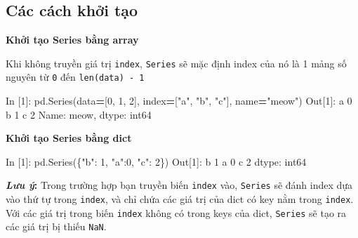 \documentclass[
]{book}
\makeatletter
\newenvironment{Shaded}{\begin{snugshade}}{\end{snugshade}}
\newcommand{\DecValTok}[1]{\textcolor[rgb]{0.00,0.00,0.81}{#1}}
\newcommand{\NormalTok}[1]{#1}
\newcommand{\OperatorTok}[1]{\textcolor[rgb]{0.81,0.36,0.00}{\textbf{#1}}}
\newcommand{\StringTok}[1]{\textcolor[rgb]{0.31,0.60,0.02}{#1}}
\newenvironment{kframe}{%
\medskip{}
\setlength{\fboxsep}{.8em}
 \def\at@end@of@kframe{}%
 \ifinner\ifhmode%
  \def\at@end@of@kframe{\end{minipage}}%
  \begin{minipage}{\columnwidth}%
 \fi\fi%
 \def\FrameCommand##1{\hskip\@totalleftmargin \hskip-\fboxsep
 \colorbox{shadecolor}{##1}\hskip-\fboxsep
     \hskip-\linewidth \hskip-\@totalleftmargin \hskip\columnwidth}%
 \MakeFramed {\advance\hsize-\width
   \@totalleftmargin\z@ \linewidth\hsize
   \@setminipage}}%
 {\par\unskip\endMakeFramed%
 \at@end@of@kframe}
\newenvironment{rmdblock}[1]
  {
  \begin{itemize}
  \renewcommand{\labelitemi}{
    \raisebox{-.7\height}[0pt][0pt]{
      {\setkeys{Gin}{width=3em,keepaspectratio}\texttt{[image: images/\#1]}}
    }
  }
  \setlength{\fboxsep}{1em}
  \begin{kframe}
  \item
  }
  {
  \end{kframe}
  \end{itemize}
  }
\newenvironment{rmdnote}
  {\begin{rmdblock}{note}}
  {\end{rmdblock}}
\makeatother
\begin{document}
\hypertarget{cuxe1c-cuxe1ch-khux1edfi-tux1ea1o}{%
\subsection{Các cách khởi tạo}\label{cuxe1c-cuxe1ch-khux1edfi-tux1ea1o}}

\textbf{Khởi tạo Series bằng array}

Khi không truyền giá trị \texttt{index}, \texttt{Series} sẽ mặc định index của nó là 1 mảng số nguyên từ \texttt{0} đến \texttt{len(data)\ -\ 1}

\begin{Shaded}
\begin{Highlighting}[]
\NormalTok{In [}\DecValTok{1}\NormalTok{]: pd.Series(data}\OperatorTok{=}\NormalTok{[}\DecValTok{0}\NormalTok{, }\DecValTok{1}\NormalTok{, }\DecValTok{2}\NormalTok{], index}\OperatorTok{=}\NormalTok{[}\StringTok{"a"}\NormalTok{, }\StringTok{"b"}\NormalTok{, }\StringTok{"c"}\NormalTok{], name}\OperatorTok{=}\StringTok{"meow"}\NormalTok{)}
\NormalTok{Out[}\DecValTok{1}\NormalTok{]:}
\NormalTok{a    }\DecValTok{0}
\NormalTok{b    }\DecValTok{1}
\NormalTok{c    }\DecValTok{2}
\NormalTok{Name: meow, dtype: int64}
\end{Highlighting}
\end{Shaded}

\textbf{Khởi tạo Series bằng dict}

\begin{Shaded}
\begin{Highlighting}[]
\NormalTok{In [}\DecValTok{1}\NormalTok{]: pd.Series(\{}\StringTok{"b"}\NormalTok{: }\DecValTok{1}\NormalTok{, }\StringTok{"a"}\NormalTok{:}\DecValTok{0}\NormalTok{, }\StringTok{"c"}\NormalTok{: }\DecValTok{2}\NormalTok{\})}
\NormalTok{Out[}\DecValTok{1}\NormalTok{]: }
\NormalTok{b    }\DecValTok{1}
\NormalTok{a    }\DecValTok{0}
\NormalTok{c    }\DecValTok{2}
\NormalTok{dtype: int64}
\end{Highlighting}
\end{Shaded}

\begin{rmdnote}
\textbf{\emph{Lưu ý}:}
Trong trường hợp bạn truyền biến \texttt{index} vào, \texttt{Series} sẽ đánh index dựa vào thứ tự trong \texttt{index}, và chỉ chứa các giá trị của dict có key nằm trong \texttt{index}.
Với các giá trị trong biến \texttt{index} không có trong keys của dict, \texttt{Series} sẽ tạo ra các giá trị bị thiếu \texttt{NaN}.
\end{rmdnote}
\end{document}
